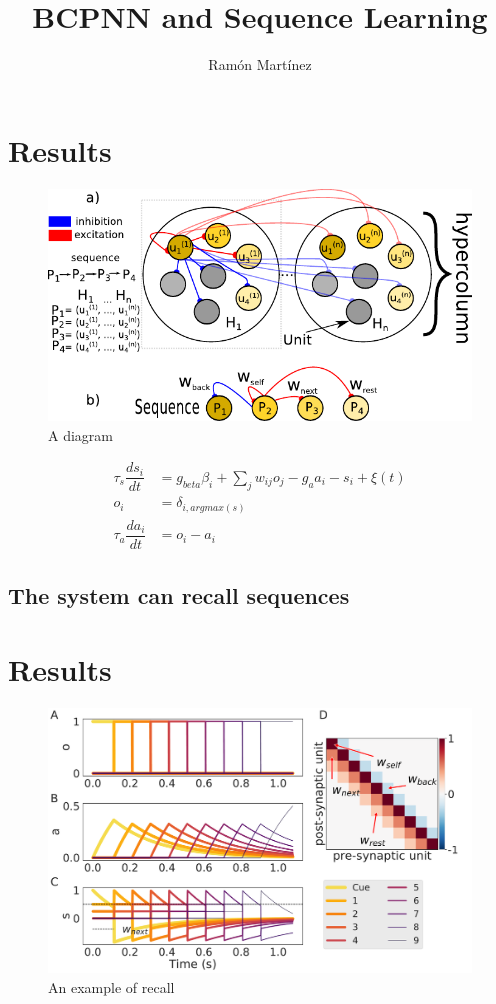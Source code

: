 \documentclass[10pt,a4paper]{article}
\author{Ram\'on Mart\'inez}
\title{BCPNN and Sequence Learning}
\begin{document}
\maketitle

\section{Results}
\begin{figure}[H]
\centering
\includegraphics[scale=1.0]{diagram.pdf}
\caption{A diagram }
\label{fig:networks_scheme}
\end{figure}


\begin{align}
\tau_s \dfrac{ds_i}{dt} &= g_{beta}\beta_i + \sum_{j} w_{ij} o_j  - g_a a_i - s_i  + \xi(t) \label{eq:simple_bcpnn} \\ 
o_i &=  \delta_{i, argmax(s)} \label{eq:simple_bcpnn_max} \\ 
\tau_a \dfrac{da_i}{dt} &= o_i - a_i \label{eq:simple_bcpnn_adaptation}
\end{align}


\subsection{The system can recall sequences}
\section{Results}
\begin{figure}[H]
\centering
\includegraphics[scale=0.25]{simple_bcpnn_recall.pdf}
\caption{An example of recall}
\label{fig:recall}
\end{figure}
\end{document}

